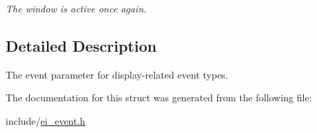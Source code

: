 \begin{DoxyCompactItemize}
\begin{DoxyCompactList}\small\item\em The window is active once again. \end{DoxyCompactList}\end{DoxyCompactItemize}


\subsection{Detailed Description}
The event parameter for display-\/related event types. 

The documentation for this struct was generated from the following file\+:\begin{DoxyCompactItemize}
\item 
include/\hyperlink{ei__event_8h}{ei\+\_\+event.\+h}\end{DoxyCompactItemize}
